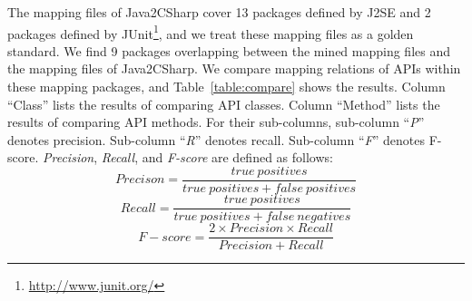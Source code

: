 The mapping files of Java2CSharp cover 13 packages defined by J2SE
and 2 packages defined by
JUnit\footnote{\url{http://www.junit.org/}}, and we treat these
mapping files as a golden standard. We find 9 packages overlapping
between the mined mapping files and the mapping files of
Java2CSharp. We compare mapping relations of APIs within these
mapping packages, and Table~\ref{table:compare} shows the results.
Column ``Class'' lists the results of comparing API classes. Column
``Method'' lists the results of comparing API methods. For their
sub-columns, sub-column ``\emph{P}'' denotes precision. Sub-column
``\emph{R}'' denotes recall. Sub-column ``\emph{F}'' denotes
F-score. \emph{Precision}, \emph{Recall}, and \emph{F-score} are
defined as follows:\vspace*{-1ex}
\begin{equation}\label{eq-precison}
Precison=\frac{true\ positives}{true\ positives+false\ positives}
\end{equation}\vspace*{-2ex}
\begin{equation}\label{eq-recall}
Recall=\frac{true\ positives}{true\ positives+false\ negatives}
\end{equation}\vspace*{-2ex}
\begin{equation}\label{eq-fscore}
F\!-\!score=\frac{2\times Precision \times Recall}{Precision+Recall}
\end{equation}\vspace*{-2ex}

